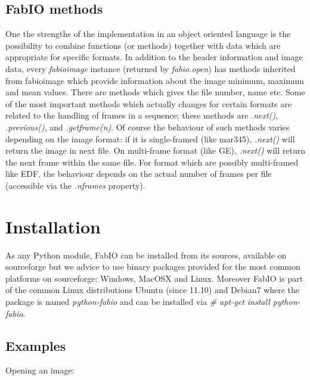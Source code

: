 \documentclass[preprint ]{iucr}
\begin{document}
\subsection{FabIO methods}



One the strengths of the implementation in an object oriented language
is the possibility to combine functions (or methods) together with data which
are appropriate for specific formats.
In addition to the header information and image data, every {\em fabioimage}
instance (returned by {\em fabio.open}) has methods inherited from fabioimage 
which provide information about the image minimum, maximum and mean values.
There are methods which gives the file number, name etc. 
Some of the most important methods which actually changes for certain formats 
are related to the handling of frames in a sequence; these methods are {\em
.next()}, {\em .previous()}, and {\em .getframe(n)}.
Of course the behaviour of such methods varies depending on the
image format: if it is single-framed (like mar345),  {\em .next()} will
return the image in next file. On multi-frame format (like GE), {\em .next()} will
return the next frame within the same file. For format which are possibly multi-framed like
EDF, the behaviour depends on the actual number of frames per file (accessible
via the {\em .nframes} property).


\section{Installation}

As any Python module, FabIO can be installed from its sources, available on 
sourceforge \cite{fabio} but we advice to use binary packages provided for the
most common platforms on sourceforge: Windows, MacOSX and Linux.
Moreover FabIO is part of the common Linux distributions Ubuntu (since 11.10)
and Debian7 where the package is named {\em python-fabio} and can be installed
via {\em \# apt-get install python-fabio}. 

\subsection{Examples}

Opening an image:
\end{document}
